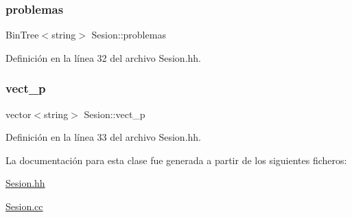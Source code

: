 \subsubsection{\texorpdfstring{problemas}{problemas}}
{\footnotesize\ttfamily Bin\+Tree$<$string$>$ Sesion\+::problemas\hspace{0.3cm}{\ttfamily [private]}}



Definición en la línea 32 del archivo Sesion.\+hh.

\mbox{\label{class_sesion_ab9459a157fdb5e1c2f975ba20305ae8f}} 
\subsubsection{\texorpdfstring{vect\+\_\+p}{vect\_p}}
{\footnotesize\ttfamily vector$<$string$>$ Sesion\+::vect\+\_\+p\hspace{0.3cm}{\ttfamily [private]}}



Definición en la línea 33 del archivo Sesion.\+hh.



La documentación para esta clase fue generada a partir de los siguientes ficheros\+:\begin{DoxyCompactItemize}
\item 
\mbox{\hyperlink{_sesion_8hh}{Sesion.\+hh}}\item 
\mbox{\hyperlink{_sesion_8cc}{Sesion.\+cc}}\end{DoxyCompactItemize}
